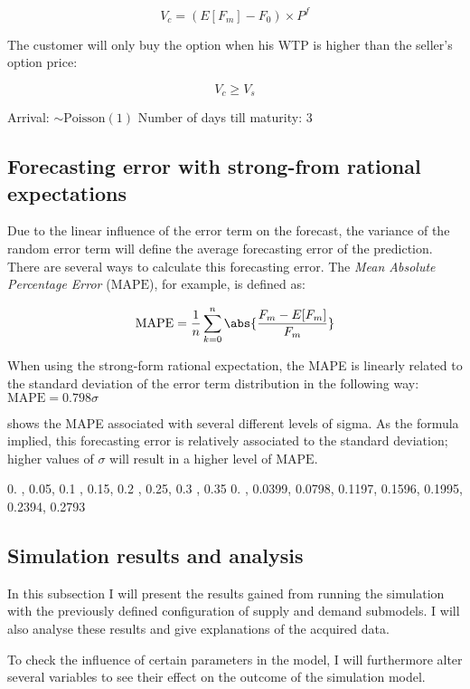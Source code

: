 $$ V_c = (E[F_m] - F_0) \times P^f $$

The customer will only buy the option when his WTP is higher than the seller's option price:

$$ V_c \ge V_s $$


Arrival: $ \sim \mbox{Poisson}(1)$
Number of days till maturity: 3



\subsection{Forecasting error with strong-from rational expectations}
Due to the linear influence of the error term on the forecast, the variance of the random error term will define the average forecasting error of the prediction. There are several ways to calculate this forecasting error. The \emph{Mean Absolute Percentage Error} ($\mbox{MAPE}$), for example, is defined as:

$$ \mbox{MAPE} = \frac{1}{n} \sum\limits_{k=0}^n \abs{\frac{F_m - E[F_m]}{F_m}} $$

When using the strong-form rational expectation, the MAPE is linearly related to the standard deviation of the error term distribution in the following way: $ \mbox{MAPE} = 0.798 \sigma $

 shows the MAPE associated with several different levels of sigma. As the formula implied, this forecasting error is relatively associated to the standard deviation; higher values of $\sigma$ will result in a higher level of $\mbox{MAPE}$.

0.  ,  0.05,  0.1 ,  0.15,  0.2 ,  0.25,  0.3 ,  0.35
0.    ,  0.0399,  0.0798,  0.1197,  0.1596,  0.1995,  0.2394, 0.2793

\subsection{Simulation results and analysis}
In this subsection I will present the results gained from running the simulation with the previously defined configuration of supply and demand submodels. I will also analyse these results and give explanations of the acquired data.

To check the influence of certain parameters in the model, I will furthermore alter several variables to see their effect on the outcome of the simulation model.


